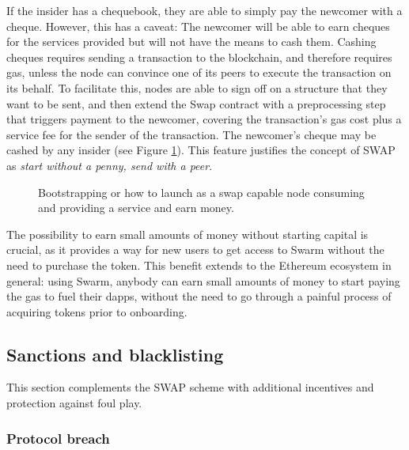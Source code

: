 If the insider has a chequebook, they are able to simply pay the newcomer with a cheque. However, this has a caveat: The newcomer will be able to earn cheques for the services provided but will not have the means to cash them. Cashing cheques requires sending a transaction to the blockchain, and therefore requires gas, unless the node can convince one of its peers to execute the transaction on its behalf. To facilitate this, nodes are able to sign off on a structure that they want to be sent, and then extend the Swap contract with a preprocessing step that triggers payment to the newcomer, covering the transaction’s gas cost plus a service fee for the sender of the transaction. The newcomer's cheque may be cashed by any insider (see Figure \ref{fig:zero-cash-entry}). This feature justifies the concept of SWAP as \emph{start without a penny, send with a peer}.

\begin{figure}[htbp]
\centering

\caption[Zero cash entry \statusorange]{Bootstrapping or how to launch as a swap capable node consuming and providing a
service and earn money.}
\label{fig:zero-cash-entry}
\end{figure}

The possibility to earn small amounts of money without starting capital is crucial, as it provides a way for new users to get access to Swarm without the need to purchase the token. This benefit extends to the Ethereum ecosystem in general: using Swarm, anybody can earn small amounts of money to start paying the gas to fuel their dapps, without the need to go through a painful process of acquiring tokens prior to onboarding. 





\subsection{Sanctions and blacklisting \statusgreen}\label{sec:sanctions}
\red{}

This section complements the SWAP scheme with additional incentives and protection against foul play. 

\subsubsection{Protocol breach}

